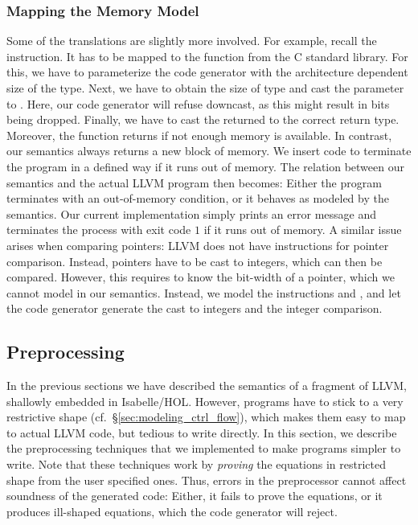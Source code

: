 \documentclass[a4paper,oribibl,envcountsame]{llncs}
\begin{document}
\subsubsection{Mapping the Memory Model}
Some of the translations are slightly more involved.
For example, recall the  instruction. It has to be mapped to the function  from
the C standard library. For this, we have to parameterize the code generator with the architecture dependent size of the  type. 
Next, we have to obtain the size of type  and cast the  parameter to . Here, our code generator will refuse downcast, as this might result in bits being dropped. Finally, we have to cast the returned  to the correct return type. 
Moreover, the  function returns  if not enough memory is available. In contrast, our semantics always returns a new block of memory.
We insert code to terminate the program in a defined way if it runs out of memory. The relation between our semantics and the actual LLVM program then 
becomes: Either the program terminates with an out-of-memory condition, or it behaves as modeled by the semantics. 
Our current implementation simply prints an error message and terminates the process with exit code $1$ if it runs out of memory.
A similar issue arises when comparing pointers: LLVM does not have instructions for pointer comparison. Instead, pointers have to be cast to integers, which can then be compared. However, this requires to know the bit-width of a pointer, which we cannot model in our semantics.
Instead, we model the instructions  and , and let the code generator generate the cast to integers and the integer comparison. 


\subsection{Preprocessing}
In the previous sections we have described the semantics of a fragment of LLVM, shallowly embedded in Isabelle/HOL. 
However, programs have to stick to a very restrictive shape (cf.~\S\ref{sec:modeling_ctrl_flow}), 
which makes them easy to map to actual LLVM code, but tedious to write directly.
In this section, we describe the preprocessing techniques that we implemented to make programs simpler to write.
Note that these techniques work by \emph{proving} the equations in restricted shape from the user specified ones. 
Thus, errors in the preprocessor cannot affect soundness of the generated code: Either, it fails to prove the equations, or it produces ill-shaped equations, 
which the code generator will reject.
\end{document}
